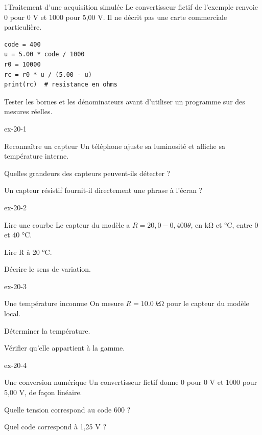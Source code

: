 \begin{docu}{1}{Traitement d'une acquisition simulée}
Le convertisseur fictif de l'exemple renvoie 0 pour 0 V et 1000 pour 5,00 V. Il ne décrit pas une carte commerciale particulière.
\begin{verbatim}
code = 400
u = 5.00 * code / 1000
r0 = 10000
rc = r0 * u / (5.00 - u)
print(rc)  # resistance en ohms
\end{verbatim}
Tester les bornes et les dénominateurs avant d'utiliser un programme sur des mesures réelles.
\end{docu}
\exercices
{}
\begin{blocLivre}{ex-20-1}\begin{exercice}[1]{Reconnaître un capteur}
Un téléphone ajuste sa luminosité et affiche sa température interne.
\begin{questions}
\item Quelles grandeurs des capteurs peuvent-ils détecter ?
\item Un capteur résistif fournit-il directement une phrase à l’écran ?
\end{questions}
\end{exercice}\end{blocLivre}
\begin{blocLivre}{ex-20-2}\begin{exercice}[1]{Lire une courbe}
Le capteur du modèle a $R=20,0-0,400\theta$, en kΩ et °C, entre 0 et 40 °C.
\begin{questions}
\item Lire R à 20 °C.
\item Décrire le sens de variation.
\end{questions}
\end{exercice}\end{blocLivre}
\begin{blocLivre}{ex-20-3}\begin{exercice}[1]{Une température inconnue}
On mesure $R=\qty{10,0}{k\ohm}$ pour le capteur du modèle local.
\begin{questions}
\item Déterminer la température.
\item Vérifier qu’elle appartient à la gamme.
\end{questions}
\end{exercice}\end{blocLivre}
\begin{blocLivre}{ex-20-4}\begin{exercice}[1]{Une conversion numérique}
Un convertisseur fictif donne 0 pour 0 V et 1000 pour 5,00 V, de façon linéaire.
\begin{questions}
\item Quelle tension correspond au code 600 ?
\item Quel code correspond à 1,25 V ?
\end{questions}
\end{exercice}\end{blocLivre}
